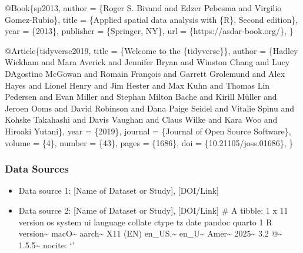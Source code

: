 \documentclass[
]{article}
\newenvironment{Shaded}{\begin{snugshade}}{\end{snugshade}}
\newcommand{\DataTypeTok}[1]{\textcolor[rgb]{0.13,0.29,0.53}{#1}}
\newcommand{\NormalTok}[1]{#1}
\newcommand{\OtherTok}[1]{\textcolor[rgb]{0.56,0.35,0.01}{#1}}
\newcommand{\VariableTok}[1]{\textcolor[rgb]{0.00,0.00,0.00}{#1}}
\providecommand{\tightlist}{%
  \setlength{\itemsep}{0pt}\setlength{\parskip}{0pt}}
\begin{document}
\begin{Shaded}
\begin{Highlighting}[]
\VariableTok{@Book}\NormalTok{\{}\OtherTok{sp2013}\NormalTok{,}
  \DataTypeTok{author}\NormalTok{ = \{Roger S. Bivand and Edzer Pebesma and Virgilio Gomez{-}Rubio\},}
  \DataTypeTok{title}\NormalTok{ = \{Applied spatial data analysis with \{R\}, Second edition\},}
  \DataTypeTok{year}\NormalTok{ = \{2013\},}
  \DataTypeTok{publisher}\NormalTok{ = \{Springer, NY\},}
  \DataTypeTok{url}\NormalTok{ = \{https://asdar{-}book.org/\},}
\NormalTok{\}}

\VariableTok{@Article}\NormalTok{\{}\OtherTok{tidyverse2019}\NormalTok{,}
  \DataTypeTok{title}\NormalTok{ = \{Welcome to the \{tidyverse\}\},}
  \DataTypeTok{author}\NormalTok{ = \{Hadley Wickham and Mara Averick and Jennifer Bryan and Winston Chang and Lucy D\textquotesingle{}Agostino McGowan and Romain François and Garrett Grolemund and Alex Hayes and Lionel Henry and Jim Hester and Max Kuhn and Thomas Lin Pedersen and Evan Miller and Stephan Milton Bache and Kirill Müller and Jeroen Ooms and David Robinson and Dana Paige Seidel and Vitalie Spinu and Kohske Takahashi and Davis Vaughan and Claus Wilke and Kara Woo and Hiroaki Yutani\},}
  \DataTypeTok{year}\NormalTok{ = \{2019\},}
  \DataTypeTok{journal}\NormalTok{ = \{Journal of Open Source Software\},}
  \DataTypeTok{volume}\NormalTok{ = \{4\},}
  \DataTypeTok{number}\NormalTok{ = \{43\},}
  \DataTypeTok{pages}\NormalTok{ = \{1686\},}
  \DataTypeTok{doi}\NormalTok{ = \{10.21105/joss.01686\},}
\NormalTok{\}}
\end{Highlighting}
\end{Shaded}

\subsubsection{Data Sources}\label{data-sources}

\begin{itemize}
\tightlist
\item
  Data source 1: {[}Name of Dataset or Study{]}, {[}DOI/Link{]}
\item
  Data source 2: {[}Name of Dataset or Study{]}, {[}DOI/Link{]} \# A
  tibble: 1 x 11 version os system ui language collate ctype tz date
  pandoc quarto 1 R version\textasciitilde{} macO\textasciitilde{}
  aarch\textasciitilde{} X11 (EN) en\_US.\textasciitilde{}
  en\_U\textasciitilde{} Amer\textasciitilde{} 2025\textasciitilde{} 3.2
  @\textasciitilde{} 1.5.5\textasciitilde{} nocite: `'
\end{itemize}
\end{document}
